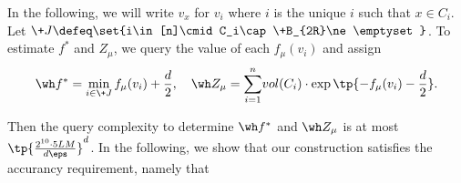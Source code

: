 In the following, we will write $v_x$ for $v_i$ where $i$ is the unique $i$ such that $x\in C_i$.
Let $\+J\defeq \set{i\in [n]\cmid C_i\cap \+B_{2R}\ne\emptyset}$. To estimate $f^*$ and $Z_{\mu}$, we query the value of each $f_\mu(v_i)$ and assign
\begin{equation}\label{eqn:hat}
    \wh f^* = \min_{i\in \+J} f_\mu(v_i) + \frac{d}{2},\quad \wh Z_{\mu} = \sum_{i=1}^n \!{vol}(C_i) \cdot \exp\tp{-f_\mu(v_i) - \frac{d}{2}}.
\end{equation}

Then the query complexity to determine $\wh f^*$ and $\wh Z_{\mu}$ is at most $\tp{\frac{2^{10}\cdot 5 LM}{d\eps}}^{d}$. In the following, we show that our construction satisfies the accurancy requirement, namely that



